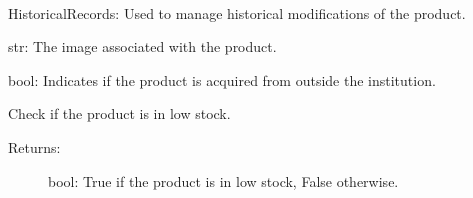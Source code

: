 \documentclass[letterpaper,10pt,english]{sphinxmanual}
\begin{document}
\begin{fulllineitems}
\begin{fulllineitems}
\label{\detokenize{modules/models:Product.models.Product.history}}~\begin{quote}\begin{description}
\end{description}\end{quote}

\sphinxAtStartPar
HistoricalRecords: Used to manage historical modifications of the product.

\end{fulllineitems}


\begin{fulllineitems}
\label{\detokenize{modules/models:Product.models.Product.image}}
\sphinxAtStartPar
str: The image associated with the product.

\end{fulllineitems}


\begin{fulllineitems}
\label{\detokenize{modules/models:Product.models.Product.isExternal}}
\sphinxAtStartPar
bool: Indicates if the product is acquired from outside the institution.

\end{fulllineitems}


\begin{fulllineitems}
\label{\detokenize{modules/models:Product.models.Product.isLowStock}}
\sphinxAtStartPar
Check if the product is in low stock.
\begin{description}
\item[{Returns:}] \leavevmode
\sphinxAtStartPar
bool: True if the product is in low stock, False otherwise.


\end{description}
\end{fulllineitems}
\end{fulllineitems}
\end{document}
